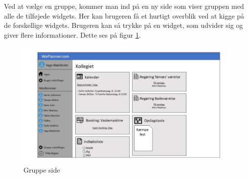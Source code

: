 \noindent Ved at vælge en gruppe, kommer man ind på en ny side som viser gruppen med alle de tilføjede widgets. Her kan brugeren få et hurtigt overblik ved at kigge på de forskellige widgets. Brugeren kan så trykke på en widget, som udvider sig og giver flere informationer. Dette ses på figur \ref{fig:board_site}.
\begin{figure}[H]
  \includegraphics[width=\linewidth]{01_Indledning/Images/Slide3.JPG}
  \caption{Gruppe side}
  \label{fig:board_site}
\end{figure}